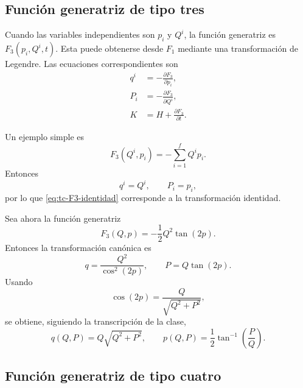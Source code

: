 \documentclass[../apunte_mecanica_clasica.tex]{subfiles}
\begin{document}
\subsection{Función generatriz de tipo tres}
\label{subsec:tc-F3}

Cuando las variables independientes son \(p_i\) y \(Q^i\), la función generatriz es \(F_3(p_i,Q^i,t)\). Esta puede obtenerse desde \(F_1\) mediante una transformación de Legendre. Las ecuaciones correspondientes son
\begin{subequations}
\label{eq:tc-F3-ecuaciones}
\begin{align}
    q^i&=-\frac{\partial F_3}{\partial p_i},
    \label{eq:tc-F3-q}\\
    P_i&=-\frac{\partial F_3}{\partial Q^i},
    \label{eq:tc-F3-P}\\
    K&=H+\frac{\partial F_3}{\partial t}.
    \label{eq:tc-F3-K}
\end{align}
\end{subequations}

Un ejemplo simple es
\begin{equation}
    F_3(Q^i,p_i)=-\sum_{i=1}^{f}Q^ip_i.
    \label{eq:tc-F3-identidad}
\end{equation}
Entonces
\begin{equation}
    q^i=Q^i,
    \qquad
    P_i=p_i,
    \label{eq:tc-F3-identidad-transformacion}
\end{equation}
por lo que \eqref{eq:tc-F3-identidad} corresponde a la transformación identidad.

Sea ahora la función generatriz
\begin{equation}
    F_3(Q,p)=-\frac{1}{2}Q^2\tan(2p).
    \label{eq:tc-F3-ejemplo}
\end{equation}
Entonces la transformación canónica es
\begin{equation}
    q=\frac{Q^2}{\cos^2(2p)},
    \qquad
    P=Q\tan(2p).
    \label{eq:tc-F3-ejemplo-transformacion}
\end{equation}
Usando
\begin{equation}
    \cos(2p)=\frac{Q}{\sqrt{Q^2+P^2}},
    \label{eq:tc-cos-ejemplo-F3}
\end{equation}
se obtiene, siguiendo la transcripción de la clase,
\begin{equation}
    q(Q,P)=Q\sqrt{Q^2+P^2},
    \qquad
    p(Q,P)=\frac{1}{2}\tan^{-1}\left(\frac{P}{Q}\right).
    \label{eq:tc-F3-ejemplo-final}
\end{equation}

\subsection{Función generatriz de tipo cuatro}
\label{subsec:tc-F4}
\end{document}
